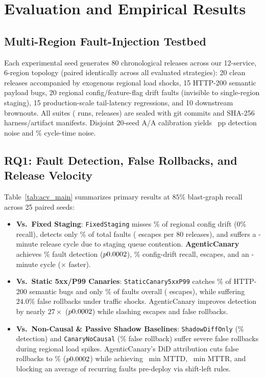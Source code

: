 \section{Evaluation and Empirical Results}
\label{sec:eval}

\subsection{Multi-Region Fault-Injection Testbed}
Each experimental seed generates 80 chronological releases across our 12-service, 6-region topology (paired identically across all evaluated strategies): 20 clean releases accompanied by exogenous regional load shocks, 15 HTTP-200 semantic payload bugs, 20 regional config/feature-flag drift faults (invisible to single-region staging), 15 production-scale tail-latency regressions, and 10 downstream brownouts. All \TotalSealedRuns{} suites (\TotalSealedRecords{} runs, \TotalSimReleases{} releases) are sealed with git commits and SHA-256 harness/artifact manifests. Disjoint 20-seed A/A calibration yields \AANoiseDetPP{}~pp detection noise and \AANoiseCyclePct{}\% cycle-time noise.



\subsection{RQ1: Fault Detection, False Rollbacks, and Release Velocity}
Table~\ref{tab:acv_main} summarizes primary results at $85\%$ blast-graph recall across 25 paired seeds:
\begin{itemize}
    \item \textbf{Vs.\ Fixed Staging}: \texttt{FixedStaging} misses \StagingDriftPct{}\% of regional config drift (0\% recall), detects only \StagingDetPct{}\% of total faults (\StagingEscapes{} escapes per 80 releases), and suffers a \StagingCycleMin{}-minute release cycle due to staging queue contention. \textbf{AgenticCanary} achieves \ACDetPct{}\% fault detection ($p0.0002{}$), \ACDriftPct{}\% config-drift recall, \ACEscapes{} escapes, and an \ACCycleMin{}-minute cycle (\CycleSpeedupVsStaging{}$\times$ faster).
    \item \textbf{Vs.\ Static 5xx/P99 Canaries}: \texttt{StaticCanary5xxP99} catches \StaticCanarySemPct{}\% of HTTP-200 semantic bugs and only \StaticCanaryDetPct{}\% of faults overall (\StaticCanaryEscapes{} escapes), while suffering $24.0\%$ false rollbacks under traffic shocks. AgenticCanary improves detection by nearly $27\times$ ($p0.0002{}$) while slashing escapes and false rollbacks.
    \item \textbf{Vs.\ Non-Causal \& Passive Shadow Baselines}: \texttt{ShadowDiffOnly} (\ShadowDetPct{}\% detection) and \texttt{CanaryNoCausal} (\NoCausalFalseRollPct{}\% false rollback) suffer severe false rollbacks during regional load spikes. AgenticCanary's DiD attribution cuts false rollbacks to \ACFalseRollPct{}\% ($p0.0002{}$) while achieving \ACMTTD{}~min MTTD, \ACMTTR{}~min MTTR, and blocking an average of \ACShiftLeft{} recurring faults pre-deploy via shift-left rules.
\end{itemize}

